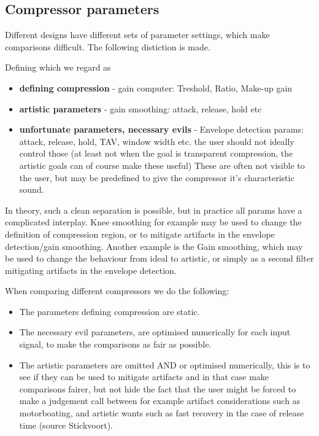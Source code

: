 \documentclass[../main2.tex]{subfiles}
\begin{document}
\subsection{Compressor parameters}
Different designs have different sets of parameter settings, which make comparisons difficult. The following distiction is made. 

Defining which we regard as 
\begin{itemize}
\item \textbf{defining compression} - gain computer: Treshold, Ratio, Make-up gain
\item \textbf{artistic parameters} - gain smoothing: attack, release, hold etc
\item \textbf{unfortunate parameters, necessary evils} - Envelope detection params: attack, release, hold, TAV, window width etc. the user should not ideally control those (at least not when the goal is transparent compression, the artistic goals can of course make these useful) These are often not visible to the user, but may be predefined to give the compressor it's characteristic sound.
\end{itemize}

In theory, such a clean separation is possible, but in practice all params have a complicated interplay. Knee smoothing for example may be used to change the definition of compression region, or to mitigate artifacts in the envelope detection/gain smoothing.
Another example is the Gain smoothing, which may be used to change the behaviour from ideal to artistic, or simply as a second filter mitigating artifacts in the envelope detection.

When comparing different compressors we do the following:
\begin{itemize}
\item The parameters defining compression are static. 
\item The necessary evil parameters, are optimised numerically for each input signal, to make the comparisons as fair as possible.
\item The artistic parameters are omitted AND or optimised numerically, this is to see if they can be used to mitigate artifacts and in that case make comparisons fairer, but not hide the fact that the user might be forced to make a judgement call between for example artifact considerations such as motorboating, and artistic wants such as fast recovery in the case of release time (source Stickvoort).
\end{itemize}
\end{document}
